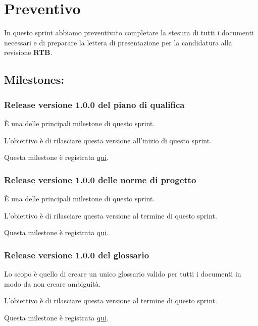 \section{Preventivo}

In questo sprint abbiamo preventivato completare la stesura di tutti i documenti necessari e di preparare la lettera di presentazione per la candidatura alla revisione \textbf{RTB}.

\subsection{Milestones:}  
\subsubsection{Release versione 1.0.0 del piano di qualifica}

È una delle principali milestone di questo sprint.

L'obiettivo è di rilasciare questa versione all'inizio di questo sprint.

Questa milestone è registrata \href{https://github.com/SWEasabi/piano-di-qualifica/milestone/2}{qui}.

\subsubsection{Release versione 1.0.0 delle norme di progetto}

È una delle principali milestone di questo sprint.

L'obiettivo è di rilasciare questa versione al termine di questo sprint.

Questa milestone è registrata \href{https://github.com/SWEasabi/norme-di-progetto/milestone/5}{qui}.

\subsubsection{Release versione 1.0.0 del glossario}

Lo scopo è quello di creare un unico glossario valido per tutti i documenti in modo da non creare ambiguità.

L'obiettivo è di rilasciare questa versione al termine di questo sprint.

Questa milestone è registrata \href{https://github.com/SWEasabi/analisi-dei-requisiti/milestone/5}{qui}.